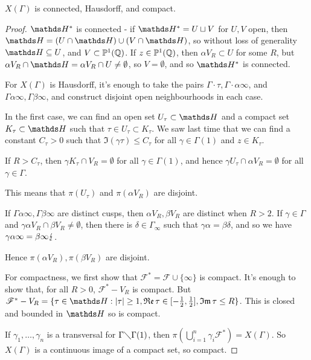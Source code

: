 \documentclass[10pt,a4paper]{article}
\begin{document}
\begin{theorem}
  $X(\Gamma)$ is connected, Hausdorff, and compact.
\end{theorem}
\begin{proof}
  $\H^\ast$ is connected - if $\H^\ast = U\sqcup V$ for $U, V$ open, then $\H = (U \cap \H) \cup (V \cap \H)$, so without loss of generality $\H \subseteq U$, and $V \subset \mathbb{P}^1(\mathbb{Q})$. If $z \in \mathbb{P}^1(\mathbb{Q})$, then $\alpha V_R \subset U$ for some $R$, but $\alpha V_R \cap \H = \alpha V_R \cap U \neq \emptyset$, so $V = \emptyset$, and so $\H^\ast$ is connected.

  For $X(\Gamma)$ is Hausdorff, it's enough to take the pairs $\Gamma \cdot \tau, \Gamma \cdot \alpha\infty$, and $\Gamma \alpha \infty, \Gamma \beta \infty$, and construct disjoint open neighbourhoods in each case.

  In the first case, we can find an open set $U_\tau \subset \H$ and a compact set $K_\tau \subset \H$ such that $\tau \in U_\tau \subset K_\tau$. We saw last time that we can find a constant $C_\tau >0$ such that $\Im(\gamma \tau) \leq C_\tau$ for all $\gamma \in \Gamma(1)$ and $z \in K_\tau$.

  If $R > C_\tau$, then $\gamma K_\tau \cap V_R = \emptyset$ for all $\gamma \in \Gamma(1)$, and hence $\gamma U_\tau \cap \alpha V_R =\emptyset$ for all $\gamma \in \Gamma$.

  This means that $\pi(U_\tau)$ and $\pi(\alpha V_R)$ are disjoint.

  If $\Gamma \alpha \infty, \Gamma \beta \infty$ are distinct cusps, then $\alpha V_R, \beta V_R$ are distinct when $R > 2$. If $\gamma \in \Gamma$ and $\gamma\alpha V_R \cap \beta V_R \neq \emptyset$, then there is $\delta \in \Gamma_\infty$ such that $\gamma \alpha= \beta \delta$, and so we have $\gamma \alpha \infty = \beta \infty \lightning$.

  Hence $\pi(\alpha V_R), \pi(\beta V_R)$ are disjoint.

  For compactness, we first show that $\mathscr{F}^\ast = \mathscr{F}\cup \{\infty\}$ is compact. It's enough to show that, for all $R > 0$, $\mathscr{F}^\ast - V_R$ is compact. But $\mathscr{F}^\ast -V_R = \{\tau \in \H : |\tau| \geq 1, \Re \tau\in [-\frac12, \frac12], \Im \tau \leq R\}$. This is closed and bounded in $\H$ so is compact.

  If $\gamma_1, \ldots, \gamma_n$ is a transversal for $\Gamma \diagdown \Gamma(1)$, then $\pi(\bigcup_{i=1}^n \gamma_i \mathscr{F}^\ast) = X(\Gamma)$. So $X(\Gamma)$ is a continuous image of a compact set, so compact.
\end{proof}
\end{document}
